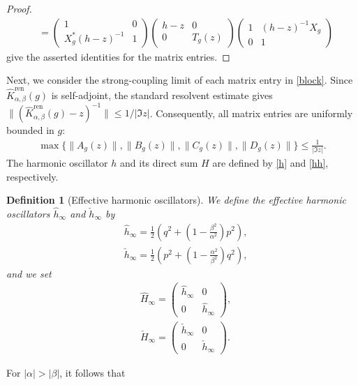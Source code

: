 \documentclass[12pt,dvipdfmx]{article}
\newtheorem{definition}[theorem]{Definition}
\begin{document}
\begin{proof}
\begin{align*}
    &=
    \begin{pmatrix}
        1 & 0\\
        X_g^\ast (h - z)^{-1} & 1
    \end{pmatrix}
    \begin{pmatrix}
        h - z & 0\\
        0 & T_g(z)
    \end{pmatrix}
    \begin{pmatrix}
        1 & (h - z)^{-1} X_g\\
        0 & 1
    \end{pmatrix}
\end{align*}
give the asserted identities for the matrix entries.
\end{proof}
%
Next, we consider the strong-coupling limit of each matrix entry in \eqref{block}. Since $\hat{K}^\mathrm{ren} _{\alpha,\beta}(g)$ is self-adjoint, the standard resolvent estimate gives $\| (\hat{K}^\mathrm{ren} _{\alpha,\beta}(g) - z)^{-1} \| \leq 1 / |\Im z|$. Consequently, all matrix entries are uniformly bounded in $g$:
\begin{align*}
    \max\{ \| A_g(z) \|, \| B_g(z) \|, \| C_g(z) \|, \| D_g(z) \| \} 
    \leq \frac{1}{ |\Im z|}.
\end{align*}
The harmonic oscillator $h$ and its direct sum $H$ are defined by \eqref{h} and \eqref{hh}, respectively. 
\begin{definition}[Effective harmonic oscillators]\label{eff}
We define the effective harmonic oscillators $\hat{h}_\infty$ and $\check{h}_\infty$  by
\begin{align*}
&\hat{h}_\infty
=
\frac12\left(
q^2+\left(1-\frac{\beta^2}{\alpha^2}\right)p^2
\right),\\
&\check{h}_\infty
=
\frac12\left(
p^2+\left(1-\frac{\alpha^2}{\beta^2}\right)q^2
\right),
\end{align*}
and we set
\begin{align*}
&\hat{H}_\infty
=
\begin{pmatrix}
\hat{h}_\infty & 0 \\
0 & \hat{h}_\infty
\end{pmatrix},\\
&\check{H}_\infty
=
\begin{pmatrix}
\check{h}_\infty & 0 \\
0 & \check{h}_\infty
\end{pmatrix}.
\end{align*}
\end{definition}
For $|\alpha|>|\beta|$, it follows that %
\end{document}
